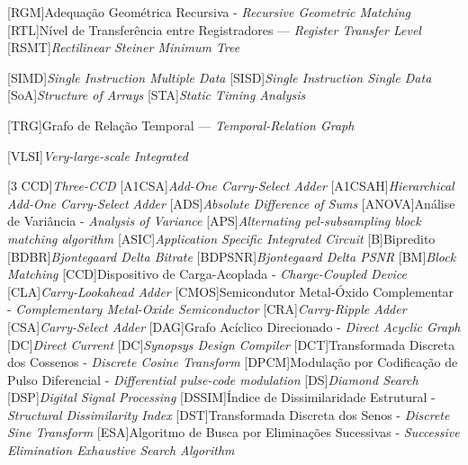 \begin{acronym}
[RGM]{Adequação Geométrica Recursiva - \textit{Recursive Geometric Matching}}
[RTL]{Nível de Transferência entre Registradores --- \textit{Register Transfer Level}}
[RSMT]{\textit{Rectilinear Steiner Minimum Tree}}

[SIMD]{\textit{Single Instruction Multiple Data}}
[SISD]{\textit{Single Instruction Single Data}}
[SoA]{\textit{Structure of Arrays}}
[STA]{\textit{Static Timing Analysis}}

[TRG]{Grafo de Relação Temporal --- \textit{Temporal-Relation Graph}}

[VLSI]{\textit{Very-large-scale Integrated}}




[3 CCD]{\textit{Three-CCD}}
[A1CSA]{\textit{Add-One Carry-Select Adder}}
[A1CSAH]{\textit{Hierarchical Add-One Carry-Select Adder}}
[ADS]{\textit{Absolute Difference of Sums}}
[ANOVA]{Análise de Variância - \textit{Analysis of Variance}}
[APS]{\textit{Alternating pel-subsampling block matching algorithm}}
[ASIC]{\textit{Application Specific Integrated Circuit}}
[B]{Bipredito}
[BDBR]{\textit{Bjontegaard Delta Bitrate}}
[BDPSNR]{\textit{Bjontegaard Delta PSNR}}
[BM]{\textit{Block Matching}}
[CCD]{Dispositivo de Carga-Acoplada - \textit{Charge-Coupled Device}}
[CLA]{\textit{Carry-Lookahead Adder}}
[CMOS]{Semicondutor Metal-Óxido Complementar - \textit{Complementary Metal-Oxide Semiconductor}}
[CRA]{\textit{Carry-Ripple Adder}}
[CSA]{\textit{Carry-Select Adder}}
[DAG]{Grafo Acíclico Direcionado - \textit{Direct Acyclic Graph}}
[DC]{\textit{Direct Current}}
[DC]{\textit{Synopsys Design Compiler}}
[DCT]{Transformada Discreta dos Cossenos - \textit{Discrete Cosine Transform}}
[DPCM]{Modulação por Codificação de Pulso Diferencial - \textit{Differential pulse-code modulation}}
[DS]{\textit{Diamond Search}}
[DSP]{\textit{Digital Signal Processing}}
[DSSIM]{Índice de Dissimilaridade Estrutural - \textit{Structural Dissimilarity Index}}
[DST]{Transformada Discreta dos Senos - \textit{Discrete Sine Transform}}
[ESA]{Algoritmo de Busca por Eliminações Sucessivas - \textit {Successive Elimination Exhaustive Search Algorithm}}

\end{acronym}
